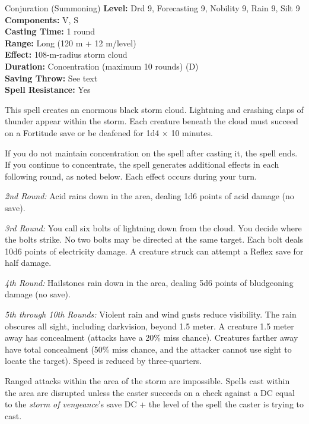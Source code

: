 {Conjuration (Summoning)}
{
	\textbf{Level:}
	Drd 9, Forecasting 9, Nobility 9, Rain 9, Silt 9\\
	\textbf{Components:}
	V, S\\
	\textbf{Casting Time:}
	1 round\\
	\textbf{Range:}
	Long (120 m + 12 m/level)\\
	\textbf{Effect:}
	108-m-radius storm cloud\\
	\textbf{Duration:}
	Concentration (maximum 10 rounds) (D)\\
	\textbf{Saving Throw:}
	See text\\
	\textbf{Spell Resistance:}
	Yes\\
}
{
	This spell creates an enormous black storm cloud. Lightning and crashing claps of thunder appear within the storm. Each creature beneath the cloud must succeed on a Fortitude save or be deafened for 1d4 $\times$ 10 minutes.

	If you do not maintain concentration on the spell after casting it, the spell ends.  If you continue to concentrate, the spell generates additional effects in each following round, as noted below. Each effect occurs during your turn.

	\textit{2nd Round:}
	Acid rains down in the area, dealing 1d6 points of acid damage (no save).

	\textit{3rd Round:}
	You call six bolts of lightning down from the cloud. You decide where the bolts strike. No two bolts may be directed at the same target. Each bolt deals 10d6 points of electricity damage. A creature struck can attempt a Reflex save for half damage.

	\textit{4th Round:}
	Hailstones rain down in the area, dealing 5d6 points of bludgeoning damage (no save).

	\textit{5th through 10th Rounds:}
	Violent rain and wind gusts reduce visibility. The rain obscures all sight, including darkvision, beyond 1.5 meter. A creature 1.5 meter away has concealment (attacks have a 20\% miss chance). Creatures farther away have total concealment (50\% miss chance, and the attacker cannot use sight to locate the target). Speed is reduced by three-quarters.

	Ranged attacks within the area of the storm are impossible. Spells cast within the area are disrupted unless the caster succeeds on a  check against a DC equal to the \emph{storm of vengeance}'s save DC + the level of the spell the caster is trying to cast.

}

